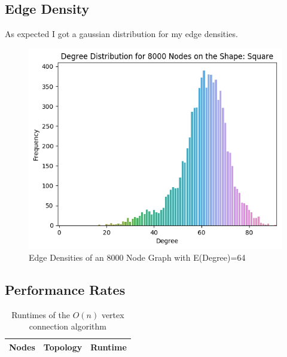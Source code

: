 \documentclass{article}
\begin{document}
  \subsection{Edge Density}
  As expected I got a gaussian distribution for my edge densities.
  \begin{figure}[H]
  \centering
  \includegraphics[width=1 \textwidth]{square/edge_density/8000_64.png}
  \caption{Edge Densities of an 8000 Node Graph with E(Degree)=64}
  \end{figure}

  \subsection{Performance Rates}
  \begin{center}
	  \begin{table}[H]
		  \begin{tabular}{ |c|c|c| }
			\hline
			Nodes & Topology & Runtime \\
			\hline
		  \end{tabular}
		  \caption{Runtimes of the $O(n)$ vertex connection algorithm}
	  \end{table}
  \end{center}

\printbibliography
\end{document}
